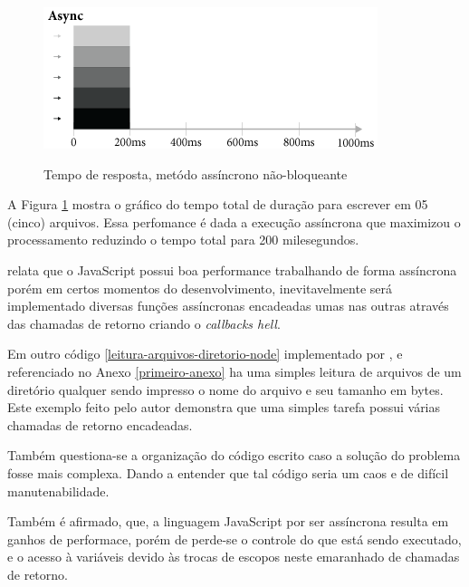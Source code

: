   \begin{figure}[H]
    \setlength{\abovecaptionskip}{0pt}
    \setlength{\belowcaptionskip}{0pt}
    \caption[Tempo de resposta, metódo assíncrono não-bloqueante]{Tempo de resposta, metódo assíncrono não-bloqueante}
    \centering
    \includegraphics[width=.85\textwidth]{imagem/timeline-node-async-caio-ribeiro.png}
    \captionsetup{justification=centering}
    \label{fig:timeline-async}
  \end{figure}

  A Figura \ref{fig:timeline-async} mostra o gráfico do tempo total de duração para escrever em 05 (cinco) arquivos. Essa 
  perfomance é dada a execução assíncrona que maximizou o processamento reduzindo o tempo total para 200 milesegundos.
  
  \cite{Pereira:2013} relata que o JavaScript possui boa performance trabalhando de forma assíncrona porém em certos 
  momentos do desenvolvimento, inevitavelmente será implementado diversas funções assíncronas encadeadas umas nas 
  outras através das chamadas de retorno criando o \textit{callbacks hell}.
  
  Em outro código \ref{leitura-arquivos-diretorio-node} implementado por , e referenciado no 
  Anexo \ref{primeiro-anexo} ha uma simples leitura de arquivos de um diretório qualquer sendo impresso o nome do arquivo 
  e seu tamanho em bytes. Este exemplo feito pelo autor demonstra que uma simples tarefa possui várias 
  chamadas de retorno encadeadas.
  
  Também questiona-se a organização do código escrito caso a solução do problema fosse mais complexa. Dando a entender que tal código
  seria um caos e de difícil manutenabilidade.
  
  Também é afirmado, que, a linguagem JavaScript por ser assíncrona resulta em ganhos de 
  performace, porém de perde-se o controle do que está sendo executado, e o acesso à variáveis devido às trocas de escopos
  neste emaranhado de chamadas de retorno.
  
